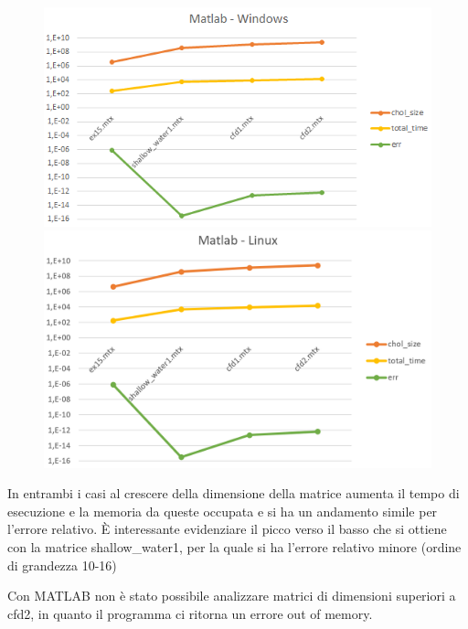 \documentclass[a4paper,10pt]{article}
\begin{document}
\begin{figure}[H]
\centering
\begin{minipage}{.6\textwidth}
  \centering
  \includegraphics[width=1\linewidth]{img/matlabwin.png}
\end{minipage}%
\begin{minipage}{.6\textwidth}
  \centering
  \includegraphics[width=1\linewidth]{img/matlablinux.png}
\end{minipage}
\end{figure}


In entrambi i casi al crescere della dimensione della matrice aumenta il tempo di esecuzione e la memoria da queste occupata e si ha un andamento simile per l’errore relativo. È interessante evidenziare il picco verso il basso che si ottiene con la matrice shallow\_water1, per la quale si ha l’errore relativo minore (ordine di grandezza 10-16)

Con MATLAB non è stato possibile analizzare matrici di dimensioni superiori a cfd2, in quanto il programma ci ritorna un errore out of memory. 
\end{document}
